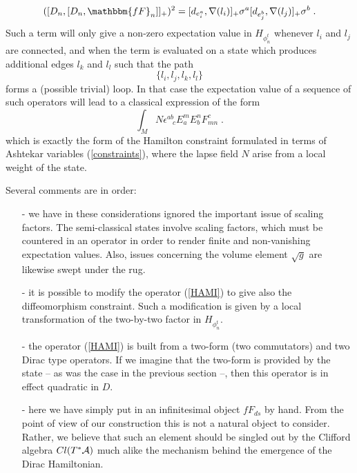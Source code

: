 \documentclass[12pt]{article}
\newcommand{\nn}{\nonumber}
\def\e{\epsilon}
\def\ca{{\cal A}}
\begin{document}
\begin{equation}
( [D_n, [D_n, \mathbbm{fF}_{n} ]   ]_+)^2 = [ d_{e_i^a},\nabla(l_i)]_+  \sigma^a [ d_{e_j^b},\nabla(l_j)]_+  \sigma^b \;.
\label{HAMI}
\end{equation}
Such a term will only give a non-zero expectation value in $H_{\phi^t_n}$ whenever $l_i$ and $l_j$ are connected, and when the term is evaluated on a state which produces additional edges $l_k$ and $l_l$ such that the path
$$
\{ l_i,l_j,l_k,l_l \}
$$
forms a (possible trivial) loop. %
In that case the expectation value of a sequence of such operators will lead to a classical expression of the form
\begin{equation}
\int_M  N \e^{ab}_{\;\; \;c}  E^{m}_a  E^{n}_b  F^c_{mn}\;.
\label{equation...}
\nn
\end{equation}
which is exactly the form of the Hamilton constraint formulated in terms of Ashtekar variables (\ref{constraints}), where the lapse field $N$ arise from a local weight of the state.

Several comments are in order:
\begin{itemize}
\item[-]
we have in these considerations ignored the important issue of scaling factors. The semi-classical states involve scaling factors, which must be countered in an operator in order to render finite and non-vanishing expectation values. Also, issues concerning the volume element $\sqrt{g}$ are likewise swept under the rug.
\item[-]
it is possible to modify the operator (\ref{HAMI}) to give also the diffeomorphism constraint. Such a modification is given by a local transformation of the two-by-two factor in $H_{\phi^t_n}$.
\item[-]
the operator (\ref{HAMI}) is built from a two-form (two commutators) and two Dirac type operators. If we imagine that the two-form is provided by the state -- as was the case in the previous section --, then this operator is in effect quadratic in $D$.
\item[-]
here we have simply put in an infinitesimal object $fF_{ds}$ by hand. From the point of view of our construction this is not a natural object to consider. Rather, we believe that such an element should be singled out by the Clifford algebra $Cl(T^*\ca)$ much alike the mechanism behind the emergence of the Dirac Hamiltonian.

\end{itemize}
\end{document}
